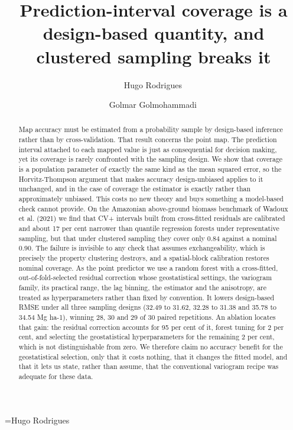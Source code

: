 \documentclass[preprint,12pt,authoryear]{elsarticle}
\begin{document}
\begin{frontmatter}

\title{Prediction-interval coverage is a design-based quantity, and
clustered sampling breaks it}

\author[uf]{Hugo Rodrigues\,}
\makeatletter\@eadauthor={Hugo Rodrigues}\makeatother
{}

\author[uf]{Golmar Golmohammadi\,}

\address[uf]{University of Florida, Range Cattle Research and Education
Center, 3401 Experiment Station, Ona, FL 33865, USA}


\begin{abstract}
Map accuracy must be estimated from a probability sample by design-based
inference rather than by cross-validation. That result concerns the point map.
The prediction interval attached to each mapped value is just as consequential
for decision making, yet its coverage is rarely confronted with the sampling
design. We show that coverage is a population parameter of exactly the same kind
as the mean squared error, so the Horvitz-Thompson argument that makes accuracy
design-unbiased applies to it unchanged, and in the case of coverage the
estimator is exactly rather than approximately unbiased. This costs no new
theory and buys something a model-based check cannot provide. On the Amazonian
above-ground biomass benchmark of Wadoux et al. (2021) we find that CV+
intervals built from cross-fitted residuals are calibrated and about 17 per cent
narrower than quantile regression forests under representative sampling, but
that under clustered sampling they cover only 0.84 against a nominal 0.90. The
failure is invisible to any check that assumes exchangeability, which is
precisely the property clustering destroys, and a spatial-block calibration
restores nominal coverage. As the point predictor we use a random forest with a
cross-fitted, out-of-fold-selected residual correction whose geostatistical
settings, the variogram family, its practical range, the lag binning, the
estimator and the anisotropy, are treated as hyperparameters rather than fixed
by convention. It lowers design-based RMSE under all three sampling designs
(32.49 to 31.62, 32.28 to 31.38 and 35.78 to 34.54 Mg ha-1), winning 28, 30 and
29 of 30 paired repetitions. An ablation locates that gain: the residual
correction accounts for 95 per cent of it, forest tuning for 2 per cent, and
selecting the geostatistical hyperparameters for the remaining 2 per cent, which
is not distinguishable from zero. We therefore claim no accuracy benefit for the
geostatistical selection, only that it costs nothing, that it changes the fitted
model, and that it lets us state, rather than assume, that the conventional
variogram recipe was adequate for these data.
\end{abstract}


\end{frontmatter}
\end{document}
